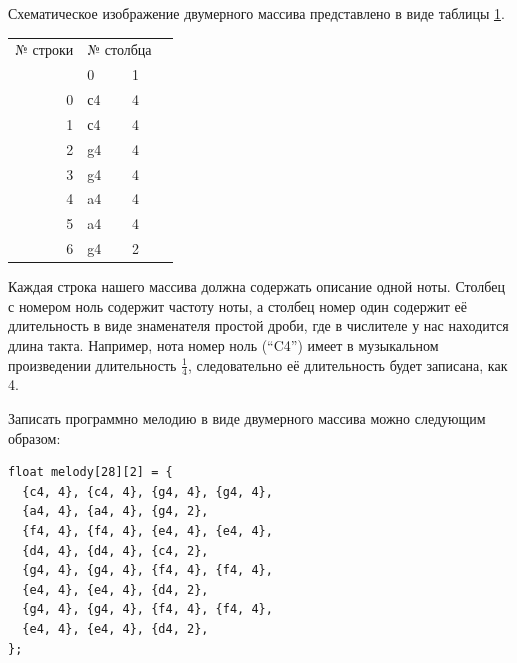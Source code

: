 \documentclass[a4paper,twoside]{book}
\newcounter{example-counter}
\begin{document}
Схематическое изображение двумерного массива представлено в виде таблицы
\ref{table:array-example-2}.

\begin{table}[ht]
  \centering
  \begin{tabular}{r|l|l|l}
    \multicolumn{1}{l}{№ строки} & \multicolumn{2}{l}{№ столбца}                 &   \\
    \multicolumn{1}{l}{}         & \multicolumn{1}{l}{0} & \multicolumn{1}{l}{1} &   \\ 
    \cline{2-3}
    0                            & с4                    & 4                     &   \\ 
    \cline{2-3}
    1                            & с4                    & 4                     &   \\
    \cline{2-3}
    2                            & g4                    & 4                     &   \\
    \cline{2-3}
    3                            & g4                    & 4                     &   \\
    \cline{2-3}
    4                            & a4                    & 4                     &   \\
    \cline{2-3}
    5                            & a4                    & 4                     &   \\
    \cline{2-3}
    6                            & g4                    & 2                     &   \\
    \cline{2-3}
  \end{tabular}
  \label{table:array-example-2}
\end{table}

Каждая строка нашего массива должна содержать описание одной ноты. Столбец с
номером ноль содержит частоту ноты, а столбец номер один содержит её
длительность в виде знаменателя простой дроби, где в числителе у нас находится
длина такта. Например, нота номер ноль (``C4'') имеет в музыкальном произведении
длительность $\frac{1}{4}$, следовательно её длительность будет записана, как 4.

Записать программно мелодию в виде двумерного массива можно следующим образом:

\begin{verbatim}
float melody[28][2] = {
  {c4, 4}, {c4, 4}, {g4, 4}, {g4, 4},
  {a4, 4}, {a4, 4}, {g4, 2},
  {f4, 4}, {f4, 4}, {e4, 4}, {e4, 4},
  {d4, 4}, {d4, 4}, {c4, 2},
  {g4, 4}, {g4, 4}, {f4, 4}, {f4, 4},
  {e4, 4}, {e4, 4}, {d4, 2},
  {g4, 4}, {g4, 4}, {f4, 4}, {f4, 4},
  {e4, 4}, {e4, 4}, {d4, 2},
};
\end{verbatim}
\end{document}
